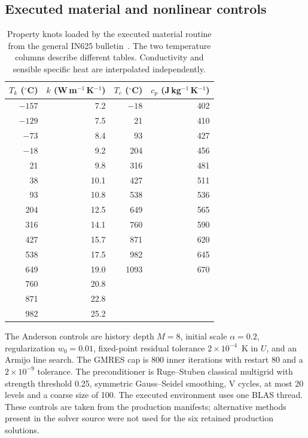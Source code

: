 \subsection{Executed material and nonlinear controls}

\begin{table}[htbp]
\centering
\caption{Property knots loaded by the executed material routine from the general IN625 bulletin~\cite{specialmetals625}. The two temperature columns describe different tables. Conductivity and sensible specific heat are interpolated independently.}
\label{tab:properties}
\begin{tabular}{rrrr}
\toprule
$T_k$ ($^\circ$C) & $k$ (W\,m$^{-1}$\,K$^{-1}$) & $T_c$ ($^\circ$C) & $c_p$ (J\,kg$^{-1}$\,K$^{-1}$)\\
\midrule
$-157$ & 7.2 & $-18$ & 402\\
$-129$ & 7.5 & 21 & 410\\
$-73$ & 8.4 & 93 & 427\\
$-18$ & 9.2 & 204 & 456\\
21 & 9.8 & 316 & 481\\
38 & 10.1 & 427 & 511\\
93 & 10.8 & 538 & 536\\
204 & 12.5 & 649 & 565\\
316 & 14.1 & 760 & 590\\
427 & 15.7 & 871 & 620\\
538 & 17.5 & 982 & 645\\
649 & 19.0 & 1093 & 670\\
760 & 20.8 & & \\
871 & 22.8 & & \\
982 & 25.2 & & \\
\bottomrule
\end{tabular}
\end{table}


The Anderson controls are history depth $M=8$, initial scale $\alpha=0.2$, regularization $w_0=0.01$, fixed-point residual tolerance $2\times10^{-4}$~K in $U$, and an Armijo line search. The GMRES cap is 800 inner iterations with restart 80 and a $2\times10^{-9}$ tolerance. The preconditioner is Ruge--Stuben classical multigrid with strength threshold 0.25, symmetric Gauss--Seidel smoothing, V cycles, at most 20 levels and a coarse size of 100. The executed environment uses one BLAS thread. These controls are taken from the production manifests; alternative methods present in the solver source were not used for the six retained production solutions.
